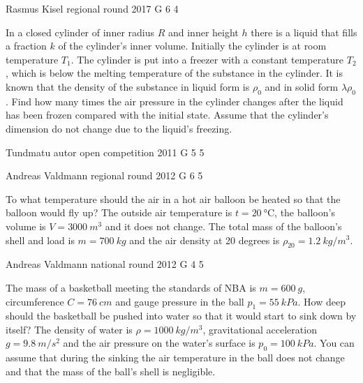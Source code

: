\documentclass[11pt]{article}
\begin{document}
{Rasmus Kisel} %
{regional round} %
{2017} %
{G 6} %
{4} %
{

\ifEngStatement
In a closed cylinder of inner radius $R$ and inner height $h$ there is a liquid that fills a fraction $k$ of the cylinder's inner volume. Initially the cylinder is at room temperature $T_{1}$. The cylinder is put into a freezer with a constant temperature $T_{2}$, which is below the melting temperature of the substance in the cylinder. It is known that the density of the substance in liquid form is $\rho_0$ and in solid form $\lambda\rho_0$. Find how many times the air pressure in the cylinder changes after the liquid has been frozen compared with the initial state. Assume that the cylinder's dimension do not change due to the liquid’s freezing.
\fi
}

\ylDisplay{} %
{Tundmatu autor} %
{open competition} %
{2011} %
{G 5} %
{5} %
{

\ifEngStatement
\fi
}

{Andreas Valdmann} %
{regional round} %
{2012} %
{G 6} %
{5} %
{

\ifEngStatement
To what temperature should the air in a hot air balloon be heated so that the balloon would fly up? The outside air temperature is $t=\SI{20}{\celsius}$, the balloon's volume is $V=\SI{3000}{m^3}$ and it does not change. The total mass of the balloon's shell and load is $m=\SI{700}{kg}$ and the air density at 20 degrees is $\rho_{20}=\SI{1,2}{kg/m^3}$.
\fi
}

{Andreas Valdmann} %
{national round} %
{2012} %
{G 4} %
{5} %
{

\ifEngStatement
The mass of a basketball meeting the standards of NBA is $m=\SI{600}{g}$, circumference $C=\SI{76}{cm}$ and gauge pressure in the ball $p_1=\SI{55}{kPa}$. How deep should the basketball be pushed into water so that it would start to sink down by itself? The density of water is $\rho=\SI{1000}{kg/m^3}$, gravitational acceleration $g=\SI{9,8}{m/s^2}$ and the air pressure on the water's surface is $p_0=\SI{100}{kPa}$. You can assume that during the sinking the air temperature in the ball does not change and that the mass of the ball’s shell is negligible.
\fi
}
\end{document}
